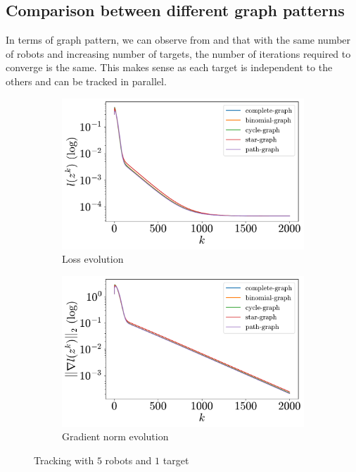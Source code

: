 \documentclass[a4paper,11pt,oneside]{book}
\begin{document}
\subsection{Comparison between different graph patterns}

In terms of graph pattern, we can observe from  and  that with the same number of robots and increasing number of targets, the number of iterations required to converge is the same. This makes sense as each target is independent to the others and can be tracked in parallel.

\begin{figure}[htb!]
      \centering
      \begin{subfigure}[t]{0.46\linewidth}
            \centering
            \includegraphics[width=\linewidth]{./figs/tracking/5_1_2_2000/loss.pdf} 
            \caption{Loss evolution}
      \end{subfigure}
      \hfill
      \begin{subfigure}[t]{0.46\linewidth}
            \centering
            \includegraphics[width=\linewidth]{./figs/tracking/5_1_2_2000/gradient.pdf} 
            \caption{Gradient norm evolution}
      \end{subfigure}
      \caption{Tracking with $5$ robots and $1$ target}
      \label{fig:tracking_5_1}
\end{figure}
\end{document}
